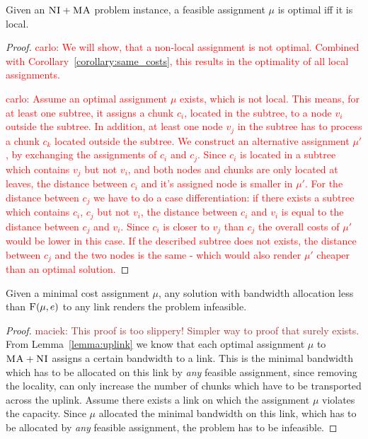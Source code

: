 \documentclass[9pt]{sigcomm-alternate}
\newcommand{\carlo}[1]{\textcolor{red}{carlo: #1}}
\newcommand{\maciek}[1]{\textcolor{brown}{maciek: #1}}
\newcommand{\VmChunkAssignment}{\mu}
\newcommand{\VirtualNode}{v}
\newcommand{\SubstrateEdge}{\ensuremath{e}}
\newcommand{\achunk}{\ensuremath{c}}
\newcommand{\CC}{\textsc{NI}}
\newcommand{\MA}{\textsc{MA}}
\newcommand{\Cost}{\textsc{F}}
\begin{document}
\begin{lemma}
Given an $\CC+\MA$ problem instance, a feasible assignment $\VmChunkAssignment$ 
is optimal iff it is local. 
\end{lemma}

\begin{proof}
\carlo{
We will show, that a non-local assignment is not optimal. Combined with 
Corollary~\ref{corollary:same_costs}, this results in the optimality of all 
local assignments.}

\carlo{
Assume an optimal assignment $\VmChunkAssignment$ exists, 
which is not local. This means, for at least one subtree, it assigns 
a chunk $\achunk_i$, located in the subtree, to a node $\VirtualNode_i$ outside 
the 
subtree. In addition, 
at least one node $\VirtualNode_j$ in the subtree has to process a chunk 
$\achunk_k$ located outside the subtree. We construct an alternative 
assignment $\VmChunkAssignment'$, by exchanging the assignments of 
$\achunk_i$ and $\achunk_j$. Since $\achunk_i$ is located in a subtree which 
contains $\VirtualNode_j$ but not $\VirtualNode_i$, and both nodes and chunks 
are only located at leaves, the distance between $\achunk_i$ and it's assigned 
node is smaller in $\VmChunkAssignment'$. For the distance between $\achunk_j$ 
we have to do a case differentiation: if there exists a subtree which 
contains $\achunk_i$, $\achunk_j$ but not $\VirtualNode_i$, the distance 
between $\achunk_i$ and $\VirtualNode_i$ is equal to the distance between 
$\achunk_j$ and $\VirtualNode_i$. Since $\achunk_i$ is closer to 
$\VirtualNode_j$ than $\achunk_j$ the overall costs of $\VmChunkAssignment'$ 
would be lower in this case. If the described subtree does not exists, the 
distance between $\achunk_j$ and the two nodes is the same - which would also 
render $\VmChunkAssignment'$ cheaper than an optimal
solution.}
\end{proof}
\begin{lemma}
Given a minimal cost assignment $\VmChunkAssignment$, 
any solution with bandwidth allocation less
than $\Cost(\VmChunkAssignment,
\SubstrateEdge)$ to any link renders the problem
infeasible.
\label{lemma:no_bandwidth}
\end{lemma}
\begin{proof}
\maciek{This proof is too slippery! Simpler way to proof that surely exists.}
From Lemma~\ref{lemma:uplink} we know that each optimal assignment 
$\VmChunkAssignment$ to $\MA+\CC$ assigns a certain bandwidth to a link. This is 
the minimal bandwidth which has to be allocated on this link by \emph{any} 
feasible assignment, since removing the locality, can only increase the number 
of chunks which have to be transported across the uplink.
Assume there exists a link on which the assignment $\VmChunkAssignment$
violates the capacity. Since $\VmChunkAssignment$ allocated the minimal 
bandwidth on this link, which has to be allocated by \emph{any} feasible 
assignment, the problem has to be infeasible. 
\end{proof}
\end{document}
